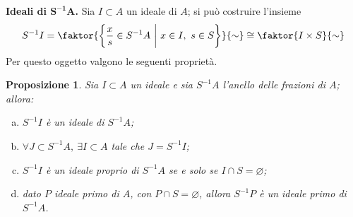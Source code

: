 \documentclass[11pt]{article}
\theoremstyle{style}
\newtheorem{prop}{Proposizione}[section]
\numberwithin{equation}{subsection}
\renewcommand{\textbf}[1]{\textsf{\bfseries #1}}
\begin{document}
\textbf{Ideali di $\mathbf{S^{-1}A} $.} 
Sia $I \subset A$ un ideale di $A$; si pu\`o costruire l'insieme 
\begin{equation}
	S^{-1}I = \faktor{\left\{ \frac{x}{s} \in S^{-1}A \ \bigg\lvert\ x \in I, \ s \in S \right\} }{\sim} \cong \faktor{I \times S}{\sim}
\end{equation}
Per questo oggetto valgono le seguenti propriet\`a.
\begin{prop}
	Sia $I \subset A$ un ideale e sia $S^{-1}A$ l'anello delle frazioni di $A$; allora:
	\begin{enumerate}[(a).]
		\item $S^{-1}I$ \`e un ideale di $S^{-1}A$;
		\item $\forall J \subset S^{-1}A, \ \exists I\subset A$ tale che $J = S^{-1}I$;
		\item $S^{-1}I$ \`e un ideale proprio di $S^{-1}A$ se e solo se $I \cap S = \varnothing$;
		\item dato $P$ ideale primo di $A$, con $P\cap S = \varnothing$, allora $S^{-1}P$ \`e un ideale primo di $S^{-1}A$.
	\end{enumerate}
\end{prop}
\end{document}
